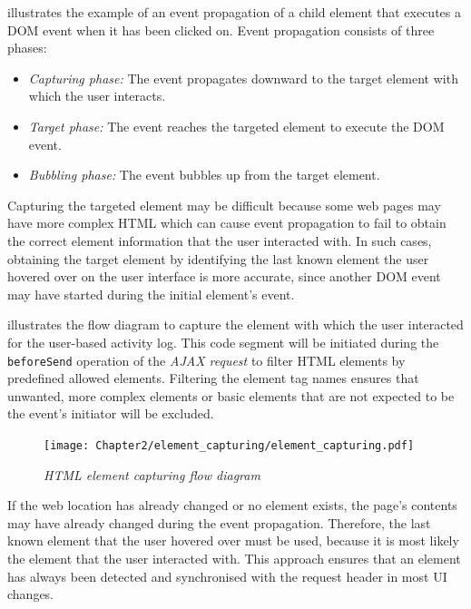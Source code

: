  illustrates the example of an event propagation of a child element that executes a DOM event when it has been clicked on. Event propagation consists of three phases:

\begin{itemize}
	\item \textit{Capturing phase:} The event propagates downward to the target element with which the user interacts.
	\item \textit{Target phase:} The event reaches the targeted element to execute the DOM event.
	\item \textit{Bubbling phase:} The event bubbles up from the target element.
\end{itemize}

Capturing the targeted element may be difficult because some web pages may have more complex HTML which can cause event propagation to fail to obtain the correct element information that the user interacted with. In such cases, obtaining the target element by identifying the last known element the user hovered over on the user interface is more accurate, since another DOM event may have started during the initial element's event.\par {} illustrates the flow diagram to capture the element with which the user interacted for the user-based activity log. This code segment will be initiated during the \texttt{beforeSend} operation of the \textit{AJAX request} to filter HTML elements by predefined allowed elements. Filtering the element tag names ensures that unwanted, more complex elements or basic elements that are not expected to be the event's initiator will be excluded. 

\begin{figure}[!htb]
	\centering %
	\texttt{[image: Chapter2/element\_capturing/element\_capturing.pdf]}
	\caption[HTML element capturing flow diagram]
	{\textit{HTML element capturing flow diagram}}\label{fig:ch3_element_event_capturing}
\end{figure}

If the web location has already changed or no element exists, the page's contents may have already changed during the event propagation. Therefore, the last known element that the user hovered over must be used, because it is most likely the element that the user interacted with. This approach ensures that an element has always been detected and synchronised with the request header in most UI changes.

